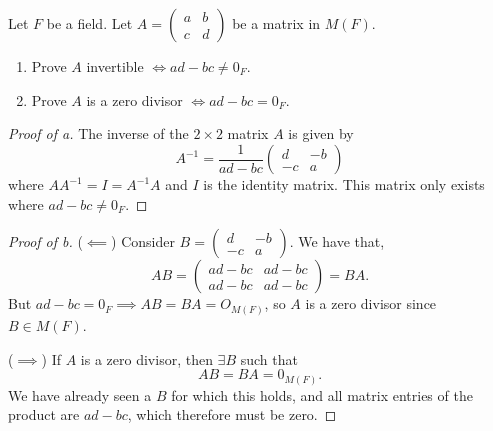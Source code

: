 \documentclass[../hw4]{subfiles}
\begin{document}
\begin{problem}
Let $F$ be a field. Let $A=\begin{pmatrix} a&b\\c&d \end{pmatrix} $ be a matrix in $M(F)$.
\begin{enumerate}[label=\alph*)]
	\item Prove $A$ invertible  $\iff ad-bc\neq 0_F$.
	\item  Prove $A$ is a zero divisor  $\iff ad-bc = 0_F$.
\end{enumerate}
\end{problem}
\begin{proof}[Proof of a]
	The inverse of the $2\times 2$ matrix $A$ is given by  \[
		A^{-1}=\frac{1}{ad-bc}\begin{pmatrix} d&-b\\-c&a \end{pmatrix}
	\] where $A A^{-1} = I = A^{-1} A$ and $I$ is the identity matrix.
	This matrix only exists where $ad-bc\neq 0_F$.
\end{proof}
\begin{proof}[Proof of b]
	($\impliedby$)
	Consider $B=\begin{pmatrix} d&-b\\-c&a \end{pmatrix} $.
	We have that, \[
		AB=\begin{pmatrix} ad-bc&ad-bc\\ad-bc&ad-bc \end{pmatrix} =BA
		.\]
	But $ad-bc = 0_F \implies AB=BA = O_{M(F)}$, so $A$ is a zero divisor since $B\in M(F)$.

	($\implies$)
	If $A$ is a zero divisor, then $\exists B$ such that \[
		AB=BA=0_{M(F)}
		.\]
	We have already seen a $B$ for which this holds, and all matrix entries of the product are  $ad-bc$, which therefore must be zero.
\end{proof}
\end{document}
